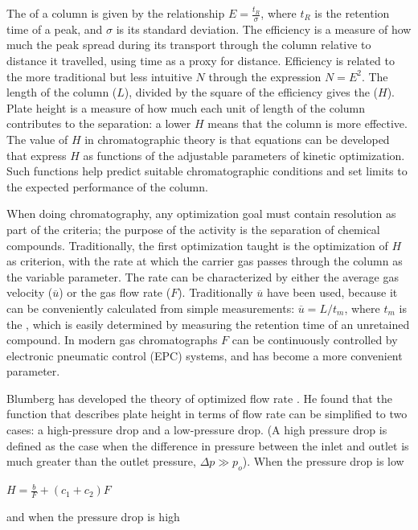 The  of a column is given by the relationship \(E =
\frac{t_R}{\sigma} \), where \(t_R\) is the retention time of a peak, and
\(\sigma\) is its standard deviation. The efficiency is a measure of how much
the peak spread during its transport through the column relative to distance it
travelled, using time as a proxy for distance. Efficiency is related to the more
traditional but less intuitive  \(N\) through the
expression \(N = E^2\). The length of the column (\(L\)), divided by the square
of the efficiency gives the  (\(H\)). Plate height is a
measure of how much each unit of length of the column contributes to the
separation: a lower \(H\) means that the column is more effective. The value of
\(H\) in chromatographic theory is that equations can be developed that express
\(H\) as functions of the adjustable parameters of kinetic optimization. Such
functions help predict suitable chromatographic conditions and set limits to the
expected performance of the column.

When doing chromatography, any optimization goal must contain resolution as part
of the criteria; the purpose of the activity is the separation of chemical
compounds. Traditionally, the first optimization taught is the optimization of
\(H\) as criterion, with the rate at which the carrier gas passes through the
column as the variable parameter. The rate can be characterized by either the
average gas velocity (\(\overline{u}\)) or the gas flow rate (\(F\)).
Traditionally \(\overline{u}\) have been used, because it can be conveniently
calculated from simple measurements: \(\overline{u} = L/t_m\), where \(t_m\) is
the , which is easily determined by measuring the
retention time of an unretained compound. In modern gas chromatographs \(F\) can
be continuously controlled by electronic pneumatic control (EPC) systems, and
has become a more convenient parameter.

Blumberg has developed the theory of optimized flow rate
\autocite{Blumberg1999}. He found that the function that describes plate height
in terms of flow rate can be simplified to two cases: a high-pressure drop and a
low-pressure drop. (A high pressure drop is defined as the case when the
difference in pressure between the inlet and outlet is much greater than the
outlet pressure, \(\Delta{p} \gg p_o\)). When the pressure drop is low 

\(H = \frac{\displaystyle b}{\displaystyle F}+(c_1+c_2)F \)

and when the pressure drop is high

